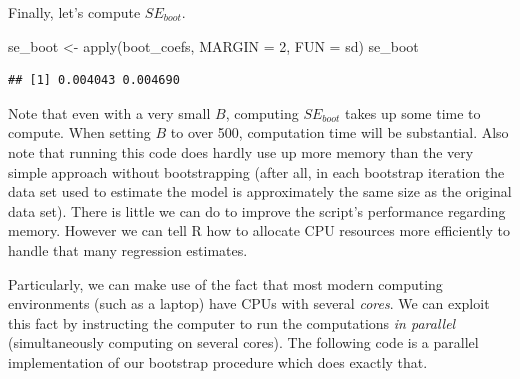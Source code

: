 \documentclass[
  12pt,
]{style/krantz}
\newenvironment{Shaded}{\begin{snugshade}}{\end{snugshade}}
\newcommand{\AttributeTok}[1]{\textcolor[rgb]{0.77,0.63,0.00}{#1}}
\newcommand{\DecValTok}[1]{\textcolor[rgb]{0.00,0.00,0.81}{#1}}
\newcommand{\FunctionTok}[1]{\textcolor[rgb]{0.00,0.00,0.00}{#1}}
\newcommand{\NormalTok}[1]{#1}
\newcommand{\OtherTok}[1]{\textcolor[rgb]{0.56,0.35,0.01}{#1}}
\begin{document}
Finally, let's compute \(SE_{boot}\).

\begin{Shaded}
\begin{Highlighting}[]
\NormalTok{se\_boot }\OtherTok{\textless{}{-}} \FunctionTok{apply}\NormalTok{(boot\_coefs, }
                 \AttributeTok{MARGIN =} \DecValTok{2}\NormalTok{,}
                 \AttributeTok{FUN =}\NormalTok{ sd)}
\NormalTok{se\_boot}
\end{Highlighting}
\end{Shaded}

\begin{verbatim}
## [1] 0.004043 0.004690
\end{verbatim}

Note that even with a very small \(B\), computing \(SE_{boot}\) takes up some time to compute. When setting \(B\) to over 500, computation time will be substantial. Also note that running this code does hardly use up more memory than the very simple approach without bootstrapping (after all, in each bootstrap iteration the data set used to estimate the model is approximately the same size as the original data set). There is little we can do to improve the script's performance regarding memory. However we can tell R how to allocate CPU resources more efficiently to handle that many regression estimates.

Particularly, we can make use of the fact that most modern computing environments (such as a laptop) have CPUs with several \emph{cores}. We can exploit this fact by instructing the computer to run the computations \emph{in parallel} (simultaneously computing on several cores). The following code is a parallel implementation of our bootstrap procedure which does exactly that.
\end{document}
